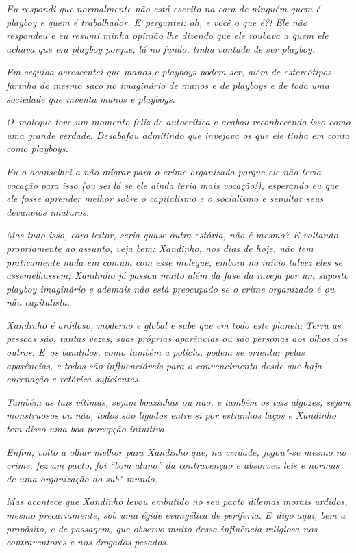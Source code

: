 \emph{Eu respondi que normalmente não está escrito na cara de ninguém
quem é playboy e quem é trabalhador. E~perguntei: ah, e você o que é?!
Ele não respondeu e eu resumi minha opinião lhe dizendo que ele roubava
a quem ele achava que era playboy porque, lá no fundo, tinha vontade de
ser playboy.}

\emph{Em seguida acrescentei que manos e playboys podem ser, além de
estereótipos, farinha do mesmo saco no imaginário de manos e de playboys
e de toda uma sociedade que inventa manos e playboys.}

\emph{O~moleque teve um momento feliz de autocrítica e acabou
reconhecendo isso como uma grande verdade. Desabafou admitindo que
invejava os que ele tinha em conta como playboys.}

\emph{Eu o aconselhei a não migrar para o crime organizado porque ele
não teria vocação para isso (ou sei lá se ele ainda teria mais
vocação!), esperando eu que ele fosse aprender melhor sobre o
capitalismo e o socialismo e sepultar seus devaneios imaturos.}

\emph{Mas tudo isso, caro leitor, seria quase outra estória, não é
mesmo? E voltando propriamente ao assunto, veja bem: Xandinho, nos dias
de hoje, não tem praticamente nada em comum com esse moleque, embora no
início talvez eles se assemelhassem; Xandinho já passou muito além da
fase da inveja por um suposto playboy imaginário e ademais não está
preocupado se o crime organizado é ou não capitalista.}

\emph{Xandinho é ardiloso, moderno e global e sabe que em todo este
planeta Terra as pessoas são, tantas vezes, suas próprias aparências ou
são personas aos olhos dos outros. E~os bandidos, como também a polícia,
podem se orientar pelas aparências, e todos são influenciáveis para o
convencimento desde que haja encenação e retórica suficientes.}

\emph{Também as tais vítimas, sejam boazinhas ou não, e também os tais
algozes, sejam monstruosos ou não, todos são ligados entre si por
estranhos laços e Xandinho tem disso uma boa percepção intuitiva.}

\emph{Enfim, volto a olhar melhor para Xandinho que, na verdade,
jogou"-se mesmo no crime, fez um pacto, foi ``bom aluno'' da contravenção
e absorveu leis e normas de uma organização do sub"-mundo.}

\emph{Mas acontece que Xandinho levou embutido no seu pacto dilemas
morais urdidos, mesmo precariamente, sob uma égide evangélica de
periferia. E~digo aqui, bem a propósito, e de passagem, que observo
muito dessa influência religiosa nos contraventores e nos drogados
pesados.}

